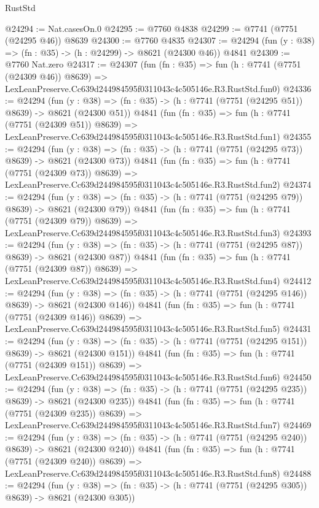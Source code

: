 \begin{lexlean}{RustStd}
\begin{coremodule}
@24294 := Nat.casesOn.{0}
@24295 := @7760 @4838
@24299 := @7741 (@7751 (@24295 @46)) @8639
@24300 := @7760 @4835
@24307 := @24294 (fun (y : @38) => (fn : @35) -> (h : @24299) -> @8621 (@24300 @46)) @4841
@24309 := @7760 Nat.zero
@24317 := @24307
    (fun (fn : @35) =>
    fun (h : @7741 (@7751 (@24309 @46)) @8639) =>
    LexLeanPreserve.Cc639d244984595f0311043c4c505146e.R3.RustStd.fun0)
@24336 := @24294
    (fun (y : @38) => (fn : @35) -> (h : @7741 (@7751 (@24295 @51)) @8639) -> @8621 (@24300 @51))
    @4841
    (fun (fn : @35) =>
    fun (h : @7741 (@7751 (@24309 @51)) @8639) =>
    LexLeanPreserve.Cc639d244984595f0311043c4c505146e.R3.RustStd.fun1)
@24355 := @24294
    (fun (y : @38) => (fn : @35) -> (h : @7741 (@7751 (@24295 @73)) @8639) -> @8621 (@24300 @73))
    @4841
    (fun (fn : @35) =>
    fun (h : @7741 (@7751 (@24309 @73)) @8639) =>
    LexLeanPreserve.Cc639d244984595f0311043c4c505146e.R3.RustStd.fun2)
@24374 := @24294
    (fun (y : @38) => (fn : @35) -> (h : @7741 (@7751 (@24295 @79)) @8639) -> @8621 (@24300 @79))
    @4841
    (fun (fn : @35) =>
    fun (h : @7741 (@7751 (@24309 @79)) @8639) =>
    LexLeanPreserve.Cc639d244984595f0311043c4c505146e.R3.RustStd.fun3)
@24393 := @24294
    (fun (y : @38) => (fn : @35) -> (h : @7741 (@7751 (@24295 @87)) @8639) -> @8621 (@24300 @87))
    @4841
    (fun (fn : @35) =>
    fun (h : @7741 (@7751 (@24309 @87)) @8639) =>
    LexLeanPreserve.Cc639d244984595f0311043c4c505146e.R3.RustStd.fun4)
@24412 := @24294
    (fun (y : @38) => (fn : @35) -> (h : @7741 (@7751 (@24295 @146)) @8639) -> @8621 (@24300 @146))
    @4841
    (fun (fn : @35) =>
    fun (h : @7741 (@7751 (@24309 @146)) @8639) =>
    LexLeanPreserve.Cc639d244984595f0311043c4c505146e.R3.RustStd.fun5)
@24431 := @24294
    (fun (y : @38) => (fn : @35) -> (h : @7741 (@7751 (@24295 @151)) @8639) -> @8621 (@24300 @151))
    @4841
    (fun (fn : @35) =>
    fun (h : @7741 (@7751 (@24309 @151)) @8639) =>
    LexLeanPreserve.Cc639d244984595f0311043c4c505146e.R3.RustStd.fun6)
@24450 := @24294
    (fun (y : @38) => (fn : @35) -> (h : @7741 (@7751 (@24295 @235)) @8639) -> @8621 (@24300 @235))
    @4841
    (fun (fn : @35) =>
    fun (h : @7741 (@7751 (@24309 @235)) @8639) =>
    LexLeanPreserve.Cc639d244984595f0311043c4c505146e.R3.RustStd.fun7)
@24469 := @24294
    (fun (y : @38) => (fn : @35) -> (h : @7741 (@7751 (@24295 @240)) @8639) -> @8621 (@24300 @240))
    @4841
    (fun (fn : @35) =>
    fun (h : @7741 (@7751 (@24309 @240)) @8639) =>
    LexLeanPreserve.Cc639d244984595f0311043c4c505146e.R3.RustStd.fun8)
@24488 := @24294
    (fun (y : @38) => (fn : @35) -> (h : @7741 (@7751 (@24295 @305)) @8639) -> @8621 (@24300 @305))

\end{coremodule}
\end{lexlean}
